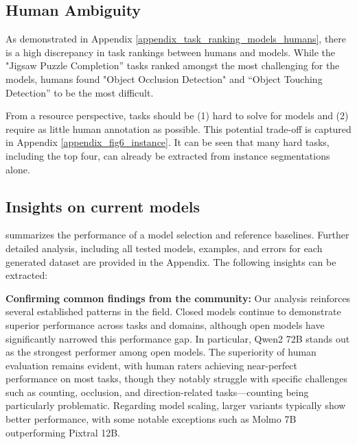 \subsection{Human Ambiguity}
\label{sec:4.2}
As demonstrated in Appendix \ref{appendix_task_ranking_models_humans}, there is a high discrepancy in task rankings between humans and models. While the "Jigsaw Puzzle Completion” tasks ranked amongst the most challenging for the models, humans found "Object Occlusion Detection" and “Object Touching Detection” to be the most difficult.
 
From a resource perspective, tasks should be (1) hard to solve for models and (2) require as little human annotation as possible. This potential trade-off is captured in Appendix \autoref{appendix_fig6_instance}. It can be seen that many hard tasks, including the top four, can already be extracted from instance segmentations alone.

\subsection{Insights on current models}
\label{sec:4.3}
 summarizes the performance of a model selection and reference baselines. Further detailed analysis, including all tested models, examples, and errors for each generated dataset are provided in the Appendix. The following insights can be extracted:

\textbf{Confirming common findings from the community:}
Our analysis reinforces several established patterns in the field. Closed models continue to demonstrate superior performance across tasks and domains, although open models have significantly narrowed this performance gap. In particular, Qwen2 72B stands out as the strongest performer among open models. The superiority of human evaluation remains evident, with human raters achieving near-perfect performance on most tasks, though they notably struggle with specific challenges such as counting, occlusion, and direction-related tasks—counting being particularly problematic. Regarding model scaling, larger variants typically show better performance, with some notable exceptions such as Molmo 7B outperforming Pixtral 12B.




